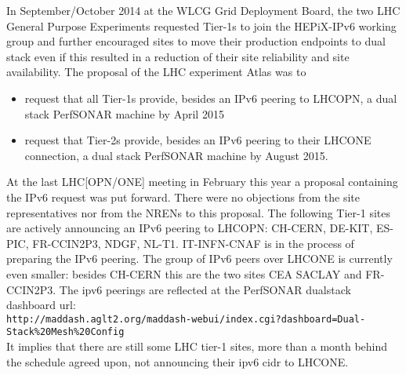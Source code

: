 In September/October 2014 at the WLCG Grid Deployment Board, the two LHC General Purpose Experiments  requested Tier-1s to join the HEPiX-IPv6 working group and further encouraged sites to move their production endpoints to dual stack even if this resulted in a reduction of their site reliability and site availability. The proposal of the LHC experiment Atlas was to
\begin{itemize}
 \item request that all Tier-1s provide,
	besides an IPv6 peering to LHCOPN,
        a dual stack PerfSONAR machine by April 2015
 \item request that Tier-2s provide,
        besides an IPv6 peering to their LHCONE connection,
        a dual stack PerfSONAR machine by August 2015.
\end{itemize}
At the last LHC[OPN/ONE] meeting in February this year a proposal containing the IPv6 request was put forward. There were no objections from the site representatives nor from the NRENs to this proposal. The following Tier-1 sites are actively announcing an IPv6 peering to LHCOPN: CH-CERN, DE-KIT, ES-PIC, FR-CCIN2P3, NDGF, NL-T1. IT-INFN-CNAF is in the process of preparing the IPv6 peering. The group of IPv6 peers over LHCONE is currently even smaller: besides CH-CERN this are the two sites CEA SACLAY and FR-CCIN2P3.
The ipv6 peerings are reflected at the PerfSONAR dualstack dashboard url:\\{\tt\small http://maddash.aglt2.org/maddash-webui/index.cgi?dashboard=Dual-Stack\%20Mesh\%20Config} \\ It implies that there are still some LHC tier-1 sites, more than a month behind the schedule agreed upon, not announcing their ipv6 cidr to LHCONE.

